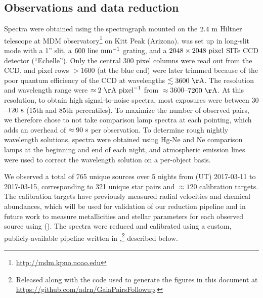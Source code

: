 \documentclass[modern, letterpaper]{aastex61}
\begin{document}
\subsection{Observations and data reduction}\label{sec:reduction}

Spectra were obtained using the  spectrograph mounted on the
$2.4~{\rm m}$ Hiltner telescope at MDM
observatory\footnote{\url{http://mdm.kpno.noao.edu}} on Kitt Peak (Arizona).
 was set up in long-slit mode with a 1'' slit, a $600~{\rm
line}~{\rm mm}^{-1}$ grating, and a $2048\times2048~{\rm pixel}$ SITe CCD
detector (``Echelle'').
Only the central 300 pixel columns were read out from the CCD, and pixel rows
$>1600$ (at the blue end) were later trimmed because of the poor quantum
efficiency of the CCD at wavelengths $\lesssim 3600~{\rm \AA}$.
The resolution and wavelength range were $\approx2~{\rm \AA}~{\rm pixel}^{-1}$
from $\approx 3600$--$7200~{\rm \AA}$.
At this resolution, to obtain high signal-to-noise spectra, most exposures were
between $30$--$120~{\rm s}$ (15th and 85th percentiles).
To maximize the number of observed pairs, we therefore chose to not take
comparison lamp spectra at each pointing, which adds an overhead of $\approx
90~{\rm s}$ per observation.
To determine rough nightly wavelength solutions, spectra were obtained using
Hg-Ne and Ne comparison lamps at the beginning and end of each night, and
atmospheric emission lines were used to correct the wavelength solution on a
per-object basis.

We observed a total of 765 unique sources over 5 nights from (UT) 2017-03-11 to
2017-03-15, corresponding to 321 unique star pairs and $\approx 120$
calibration targets.
The calibration targets have previously measured radial velocities and chemical
abundances, which will be used for validation of our reduction pipeline and in
future work to measure metallicities and stellar parameters for each observed
source using  (\citealt{Ness:TODO}).
The spectra were reduced and calibrated using a custom, publicly-available
pipeline written in \python,\footnote{Released along with the code used to
generate the figures in this document at
\url{https://github.com/adrn/GaiaPairsFollowup}.} described below.
\end{document}
